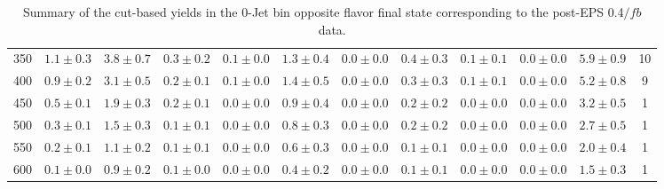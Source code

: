 \begin{table}[!hb]
{\begin{center}
\begin{tabular}{l c c c c c c c c c c c }
350 & $1.1\pm0.3$ & $3.8\pm0.7$ & $0.3\pm0.2$ & $0.1\pm0.0$ & $1.3\pm0.4$ & $0.0\pm0.0$ & $0.4\pm0.3$ & $0.1\pm0.1$ & $0.0\pm0.0$ & $5.9\pm0.9$ & 10 \\
400 & $0.9\pm0.2$ & $3.1\pm0.5$ & $0.2\pm0.1$ & $0.1\pm0.0$ & $1.4\pm0.5$ & $0.0\pm0.0$ & $0.3\pm0.3$ & $0.1\pm0.1$ & $0.0\pm0.0$ & $5.2\pm0.8$ & 9 \\
450 & $0.5\pm0.1$ & $1.9\pm0.3$ & $0.2\pm0.1$ & $0.0\pm0.0$ & $0.9\pm0.4$ & $0.0\pm0.0$ & $0.2\pm0.2$ & $0.0\pm0.0$ & $0.0\pm0.0$ & $3.2\pm0.5$ & 1 \\
500 & $0.3\pm0.1$ & $1.5\pm0.3$ & $0.1\pm0.1$ & $0.0\pm0.0$ & $0.8\pm0.3$ & $0.0\pm0.0$ & $0.2\pm0.2$ & $0.0\pm0.0$ & $0.0\pm0.0$ & $2.7\pm0.5$ & 1 \\
550 & $0.2\pm0.1$ & $1.1\pm0.2$ & $0.1\pm0.1$ & $0.0\pm0.0$ & $0.6\pm0.3$ & $0.0\pm0.0$ & $0.1\pm0.1$ & $0.0\pm0.0$ & $0.0\pm0.0$ & $2.0\pm0.4$ & 1 \\
600 & $0.1\pm0.0$ & $0.9\pm0.2$ & $0.1\pm0.0$ & $0.0\pm0.0$ & $0.4\pm0.2$ & $0.0\pm0.0$ & $0.1\pm0.1$ & $0.0\pm0.0$ & $0.0\pm0.0$ & $1.5\pm0.3$ & 1 \\
\hline
\end{tabular}
\end{center}
}
\caption{Summary of the cut-based yields in the 0-Jet bin opposite flavor final state corresponding to the post-EPS 0.4$/fb$ data.}
\end{table}
